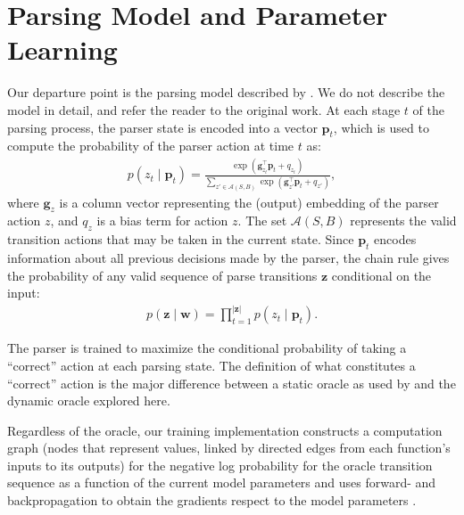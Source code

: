 \documentclass[11pt]{article}
\begin{document}
\section{Parsing Model and Parameter Learning}
Our departure point is the parsing model described by
.
We do not describe the model in detail, and refer the reader to the original
work.
At each stage $t$ of the parsing process, the parser state is encoded into a vector
$\mathbf{p}_t$, which is used to compute the probability of the parser action at
time $t$ as:
\begin{align}
p(z_t \mid \mathbf{p}_t) = \frac{\exp \left( \mathbf{g}_{z_t}^{\top}
\mathbf{p}_t + q_{z_t} \right)}{\sum_{z' \in \mathcal{A}(S,B)} \exp \left(
\mathbf{g}_{z'}^{\top} \mathbf{p}_t + q_{z'} \right)},
\label{eq:local-objective}
\end{align}
where $\mathbf{g}_z$ is a column vector representing the (output) embedding of
the parser action $z$, and $q_z$ is a bias term for action $z$. The set
$\mathcal{A}(S,B)$ represents the valid transition actions that may be taken in
the current state.
Since $\mathbf{p}_t$ encodes information about all
previous decisions made by the parser, the chain rule gives
the probability of any valid sequence of parse transitions $\boldsymbol{z}$ conditional on the input:
\begin{align}
p(\boldsymbol{z} \mid \boldsymbol{w}) = \prod_{t=1}^{|\boldsymbol{z}|} p(z_t \mid \mathbf{p}_t). \label{eq:objective}
\end{align}


The parser is trained to maximize the conditional probability of taking a
``correct'' action at each parsing state.  The definition of what
constitutes a ``correct'' action is the major difference between a static oracle
as used by  and the dynamic oracle explored here.

Regardless of the oracle, our training implementation constructs a
computation graph (nodes that represent values, linked by directed
edges from each function's inputs to its outputs) for the negative log
probability for the oracle transition sequence as a function of the current
model parameters and uses forward- and
backpropagation to obtain the gradients respect to the model parameters
\cite[section 4]{lecun:1998}. 
\end{document}
